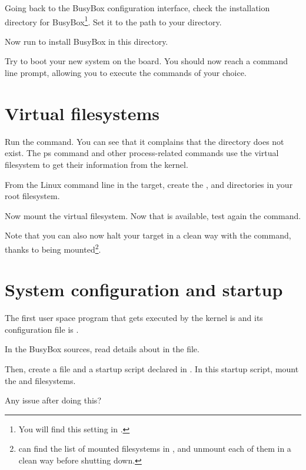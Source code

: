 Going back to the BusyBox configuration interface,
check the installation directory for BusyBox\footnote{You will find
this setting in
.}.
Set it to the path to your  directory.

Now run  to install BusyBox in this directory.

Try to boot your new system on the board. You should now reach a
command line prompt, allowing you to execute the commands of your
choice.

\section{Virtual filesystems}

Run the  command. You can see that it complains that the
 directory does not exist. The ps command and other
process-related commands use the  virtual filesystem to get
their information from the kernel.

From the Linux command line in the target, create the ,
 and  directories in your root filesystem.

Now mount the  virtual filesystem. Now that  is
available, test again the  command.

Note that you can also now halt your target in a clean way with the 
command, thanks to  being mounted\footnote{
can find the list of mounted filesystems in , and
unmount each of them in a clean way before shutting down.}.

\section{System configuration and startup}

The first user space program that gets executed by the kernel is
 and its configuration file is .

In the BusyBox sources, read details about  in the
 file.

Then, create a  file and a 
startup script declared in . In this startup
script, mount the  and  filesystems.

Any issue after doing this?

